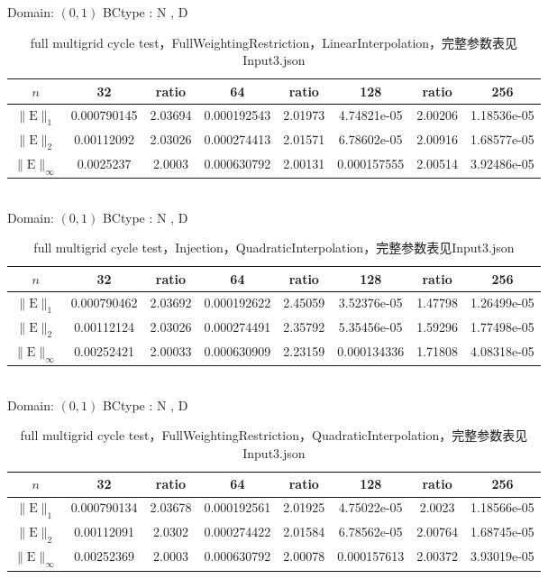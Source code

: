 \documentclass[a4paper,twoside]{ctexart}
\begin{document}
\noindent Domain: $(0,1)$
BCtype : N , D
\begin{table}[htbp]
\centering\begin{tabular}{c|ccccccc}
\hline
$n$&32&ratio&64&ratio&128&ratio&256\\
\hline
$\|\mathrm{E}\|_1$&0.000790145&2.03694&0.000192543&2.01973&4.74821e-05&2.00206&1.18536e-05\\
\hline
$\|\mathrm{E}\|_2$&0.00112092&2.03026&0.000274413&2.01571&6.78602e-05&2.00916&1.68577e-05\\
\hline
$\|\mathrm{E}\|_{\infty}$&0.0025237&2.0003&0.000630792&2.00131&0.000157555&2.00514&3.92486e-05\\
\hline
\end{tabular}
\caption{full multigrid cycle test，FullWeightingRestriction，LinearInterpolation，完整参数表见Input3.json}
\end{table}\\

\noindent Domain: $(0,1)$
BCtype : N , D
\begin{table}[htbp]
\centering\begin{tabular}{c|ccccccc}
\hline
$n$&32&ratio&64&ratio&128&ratio&256\\
\hline
$\|\mathrm{E}\|_1$&0.000790462&2.03692&0.000192622&2.45059&3.52376e-05&1.47798&1.26499e-05\\
\hline
$\|\mathrm{E}\|_2$&0.00112124&2.03026&0.000274491&2.35792&5.35456e-05&1.59296&1.77498e-05\\
\hline
$\|\mathrm{E}\|_{\infty}$&0.00252421&2.00033&0.000630909&2.23159&0.000134336&1.71808&4.08318e-05\\
\hline
\end{tabular}
\caption{full multigrid cycle test，Injection，QuadraticInterpolation，完整参数表见Input3.json}
\end{table}\\

\noindent Domain: $(0,1)$
BCtype : N , D
\begin{table}[htbp]
\centering\begin{tabular}{c|ccccccc}
\hline
$n$&32&ratio&64&ratio&128&ratio&256\\
\hline
$\|\mathrm{E}\|_1$&0.000790134&2.03678&0.000192561&2.01925&4.75022e-05&2.0023&1.18566e-05\\
\hline
$\|\mathrm{E}\|_2$&0.00112091&2.0302&0.000274422&2.01584&6.78562e-05&2.00764&1.68745e-05\\
\hline
$\|\mathrm{E}\|_{\infty}$&0.00252369&2.0003&0.000630792&2.00078&0.000157613&2.00372&3.93019e-05\\
\hline
\end{tabular}
\caption{full multigrid cycle test，FullWeightingRestriction，QuadraticInterpolation，完整参数表见Input3.json}
\end{table}\\
\end{document}
